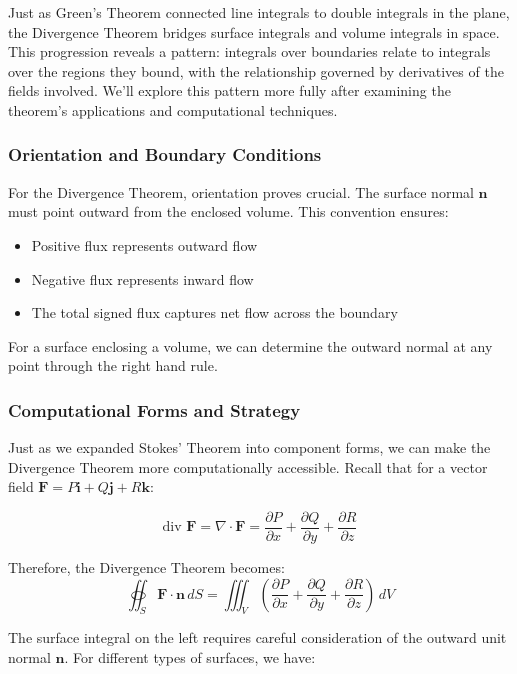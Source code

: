 \noindent Just as Green's Theorem connected line integrals to double integrals in the plane, the Divergence Theorem bridges surface integrals and volume integrals in space. This progression reveals a pattern: integrals over boundaries relate to integrals over the regions they bound, with the relationship governed by derivatives of the fields involved. We'll explore this pattern more fully after examining the theorem's applications and computational techniques.


\subsubsection*{Orientation and Boundary Conditions}

\noindent For the Divergence Theorem, orientation proves crucial. The surface normal $\mathbf{n}$ must point outward from the enclosed volume. This convention ensures:
\begin{itemize}
    \item Positive flux represents outward flow
    \item Negative flux represents inward flow
    \item The total signed flux captures net flow across the boundary
\end{itemize}

\noindent For a surface enclosing a volume, we can determine the outward normal at any point through the right hand rule.

\subsubsection*{Computational Forms and Strategy}

\noindent Just as we expanded Stokes' Theorem into component forms, we can make the Divergence Theorem more computationally accessible. Recall that for a vector field $\mathbf{F} = P\mathbf{i} + Q\mathbf{j} + R\mathbf{k}$:

\[
\text{div }\mathbf{F} = \nabla \cdot \mathbf{F} = \frac{\partial P}{\partial x} + \frac{\partial Q}{\partial y} + \frac{\partial R}{\partial z}
\]

\noindent Therefore, the Divergence Theorem becomes:
\[
\oiint_S \mathbf{F} \cdot \mathbf{n}\,dS = \iiint_V \left(\frac{\partial P}{\partial x} + \frac{\partial Q}{\partial y} + \frac{\partial R}{\partial z}\right)\,dV
\]

\noindent The surface integral on the left requires careful consideration of the outward unit normal $\mathbf{n}$. For different types of surfaces, we have:

